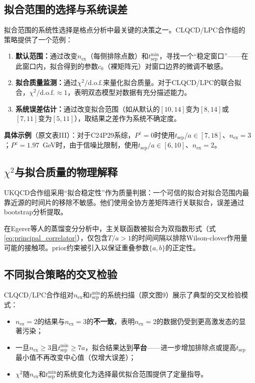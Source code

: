\documentclass[12pt,a4paper]{ctexart}
\theoremstyle{definition}
\begin{document}
\subsection{拟合范围的选择与系统误差}

拟合范围的系统性选择是格点分析中最关键的决策之一。CLQCD/LPC合作组的策略\cite{Chen2025gluon}提供了一个范例：

\begin{enumerate}
    \item \textbf{默认范围：}通过改变$n_{\text{ex}}$（每侧排除点数）和$t_{\text{sep}}^{\text{min}}$，寻找一个``稳定窗口''——在此窗口内，拟合得到的参数$c_0$（裸矩阵元）对窗口边界的微调不敏感。
    \item \textbf{拟合质量监测：}通过$\chi^2/\text{d.o.f.}$来量化拟合质量。对于CLQCD/LPC的联合拟合，$\chi^2/\text{d.o.f.} \approx 1$，表明双态模型对数据有充分描述能力。
    \item \textbf{系统误差估计：}通过改变拟合范围（如从默认的$[10,14]$变为$[8,14]$或$[7,11]$变为$[5,11]$），取结果之差作为系统不确定度。
\end{enumerate}

\textbf{具体示例}\cite{Chen2025gluon}（原文表III）：对于C24P29系综，$P^z = 0$时使用$t_{\text{sep}}/a \in [7,18]$、$n_{\text{ex}} = 3$；$P^z = 1.97$~GeV时，由于信噪比限制，使用$t_{\text{sep}}/a \in [6,10]$、$n_{\text{ex}} = 2$。

\subsection{$\chi^2$与拟合质量的物理解释}

UKQCD合作组\cite{UKQCD1993}采用``拟合稳定性''作为质量判据：一个可信的拟合对拟合范围内最靠近源的时间片的移除不敏感。他们使用全协方差矩阵进行关联拟合，误差通过bootstrap分析提取。

在Egerer等人的蒸馏变分分析中\cite{Egerer2021a}，主关联函数被拟合为双指数形式（式\ref{eq:principal_correlator}），仅包含$T/a > 1$的时间间隔以排除Wilson-clover作用量可能的接触项。prior约束被引入以保证重叠参数$\{a, b\}$的正定性。

\subsection{不同拟合策略的交叉检验}

CLQCD/LPC合作组对$n_{\text{ex}}$和$t_{\text{sep}}^{\text{min}}$的系统扫描（原文图9）展示了典型的交叉检验模式\cite{Chen2025gluon}：

\begin{itemize}
    \item $n_{\text{ex}} = 2$的结果与$n_{\text{ex}} = 3$的\textbf{不一致}，表明$n_{\text{ex}} = 2$的数据仍受到更高激发态的显著污染；
    \item 一旦$n_{\text{ex}} \geq 3$且$t_{\text{sep}}^{\text{min}} \geq 7a$，拟合结果达到\textbf{平台}——进一步增加排除点或提高$t_{\text{sep}}$最小值不再改变中心值（仅增大误差）；
    \item $\chi^2$随$n_{\text{ex}}$和$t_{\text{sep}}^{\text{min}}$的系统变化为选择最优拟合范围提供了定量指导。
\end{itemize}
\end{document}
